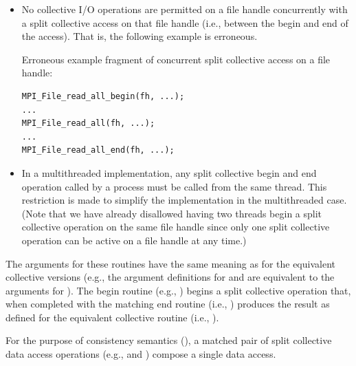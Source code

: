 \begin{itemize}
\item No collective I/O operations are permitted on a file handle
concurrently with a split collective access on that file handle
(i.e., between the begin and end of the access). That is, the following example is erroneous.
\begin{example}
\label{io-erroneoussplitcollective}
Erroneous example fragment of concurrent split collective access on a
file handle:
\begin{lstlisting}[language={[MPI]C}]
MPI_File_read_all_begin(fh, ...);
...
MPI_File_read_all(fh, ...);
...
MPI_File_read_all_end(fh, ...);
\end{lstlisting}
\end{example}

\item In a multithreaded implementation, any split collective
                begin and end operation called by a process must be
                called from the same thread.  This restriction is made
                to simplify the implementation in the multithreaded
                case.
                (Note that we have already disallowed having two
                threads begin a split collective operation on the same
                file handle since only one split collective operation can be
                active on a file handle at any time.)
\end{itemize}

The arguments for these routines have the same meaning as for
the equivalent collective versions
(e.g., the argument definitions for 
and  are equivalent to the
arguments for ).
The begin routine (e.g., )
begins a split collective operation that,
when completed with the matching end routine
(i.e., )
produces the result as defined for the equivalent collective
routine (i.e., ).

For the purpose of consistency semantics
(),
a matched pair of split collective data access operations
(e.g.,  and )
compose a single data access.


